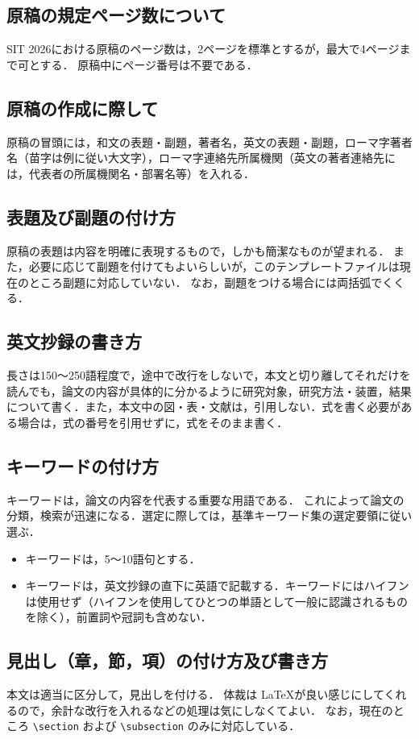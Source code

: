 \documentclass[year=2026]{sit}
\begin{document}
\subsection{原稿の規定ページ数について}
SIT 2026における原稿のページ数は，2ページを標準とするが，最大で4ページまで可とする．
原稿中にページ番号は不要である． 

\subsection{原稿の作成に際して}
原稿の冒頭には，和文の表題・副題，著者名，英文の表題・副題，ローマ字著者名（苗字は例に従い大文字），ローマ字連絡先所属機関（英文の著者連絡先には，代表者の所属機関名・部署名等）を入れる．

\subsection{表題及び副題の付け方}
原稿の表題は内容を明確に表現するもので，しかも簡潔なものが望まれる．
また，必要に応じて副題を付けてもよいらしいが，このテンプレートファイルは現在のところ副題に対応していない．
なお，副題をつける場合には両括弧でくくる．

\subsection{英文抄録の書き方}
長さは150～250語程度で，途中で改行をしないで，本文と切り離してそれだけを読んでも，論文の内容が具体的に分かるように研究対象，研究方法・装置，結果について書く．また，本文中の図・表・文献は，引用しない．式を書く必要がある場合は，式の番号を引用せずに，式をそのまま書く．

\subsection{キーワードの付け方}
キーワードは，論文の内容を代表する重要な用語である．
これによって論文の分類，検索が迅速になる．選定に際しては，基準キーワード集の選定要領に従い選ぶ．
\begin{itemize}
  \item[(1)] キーワードは，5～10語句とする．
  \item[(2)] キーワードは，英文抄録の直下に英語で記載する．キーワードにはハイフンは使用せず（ハイフンを使用してひとつの単語として一般に認識されるものを除く），前置詞や冠詞も含めない．
\end{itemize}

\subsection{見出し（章，節，項）の付け方及び書き方}
本文は適当に区分して，見出しを付ける．
体裁は \LaTeX が良い感じにしてくれるので，余計な改行を入れるなどの処理は気にしなくてよい．
なお，現在のところ \verb|\section| および \verb|\subsection| のみに対応している．
\end{document}
